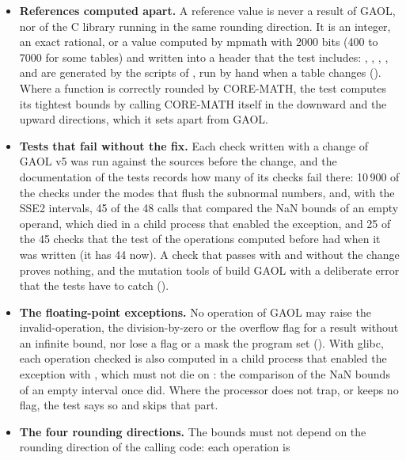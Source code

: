 \begin{itemize}
\item[$\bullet$] \textbf{References computed apart.} A reference value is
  never a result of GAOL, nor of the C library running in the same rounding
  direction. It is an integer, an exact rational, or a value computed by
  mpmath with 2000 bits (400 to 7000 for some tables) and written into a
  header that the test includes: ,
  , ,
  ,  and
   are generated by the scripts
   of , run by hand when a table changes
  (). Where a function is correctly rounded by CORE-MATH,
  the test computes its tightest bounds by calling CORE-MATH itself in the
  downward and the upward directions, which it sets apart from GAOL.
\item[$\bullet$] \textbf{Tests that fail without the fix.} Each check
  written with a change of GAOL v5 was run against the sources before the
  change, and the documentation of the tests records how many of its checks
  fail there: 10\,900 of the checks under the modes that flush the subnormal
  numbers, and, with the SSE2 intervals, 45 of the 48 calls that compared the NaN
  bounds of an empty operand, which died in a child process that enabled the
  exception, and 25 of the 45 checks that the test of the operations
  computed before  had when it was written (it has 44 now). A check that passes with and without the change proves
  nothing, and the mutation tools of  build GAOL with a
  deliberate error that the tests have to catch ().
\item[$\bullet$] \textbf{The floating-point exceptions.} No operation of GAOL
  may raise the invalid-operation, the division-by-zero or the overflow flag
  for a result without an infinite bound, nor lose a flag or a mask the
  program set (). With glibc, each operation
  checked is also computed in a child process that enabled the exception
  with , which must not die on : the
  comparison of the NaN bounds of an empty interval once did. Where the
  processor does not trap, or keeps no flag, the test says so and skips
  that part.
\item[$\bullet$] \textbf{The four rounding directions.} The bounds must not
  depend on the rounding direction of the calling code: each operation is

\end{itemize}
